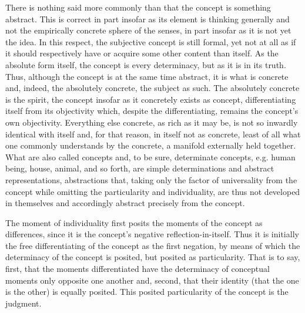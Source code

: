There is nothing said more commonly than that
the concept is something abstract.
This is correct in part insofar as
its element is thinking generally
and not the empirically concrete sphere of the senses,
in part insofar as it is not yet the idea.
In this respect, the subjective concept is still formal,
yet not at all as if it should respectively have or acquire
some other content than itself.
As the absolute form itself,
the concept is every determinacy,
but as it is in its truth.
Thus, although the concept is
at the same time abstract,
it is what is concrete
and, indeed, the absolutely concrete,
the subject as such.
The absolutely concrete is the spirit,
the concept insofar as it concretely exists as concept,
differentiating itself from its objectivity which,
despite the differentiating, remains the concept's own objectivity.
Everything else concrete, as rich as it may be,
is not so inwardly identical with itself
and, for that reason, in itself not as concrete,
least of all what one commonly understands
by the concrete, a manifold externally held together.
What are also called concepts and, to be sure, determinate concepts,
e.g. human being, house, animal, and so forth, are
simple determinations and abstract representations,
abstractions that, taking only the factor of universality
from the concept while omitting the particularity and individuality,
are thus not developed in themselves and
accordingly abstract precisely from the concept.

The moment of individuality first posits
the moments of the concept as differences,
since it is the concept's negative reflection-in-itself.
Thus it is initially the free differentiating of
the concept as the first negation,
by means of which the determinacy of the concept is posited,
but posited as particularity.
That is to say, first, that the moments differentiated have
the determinacy of conceptual moments only opposite one another
and, second, that their identity (that the one is the other) is equally posited.
This posited particularity of the concept is the judgment.

